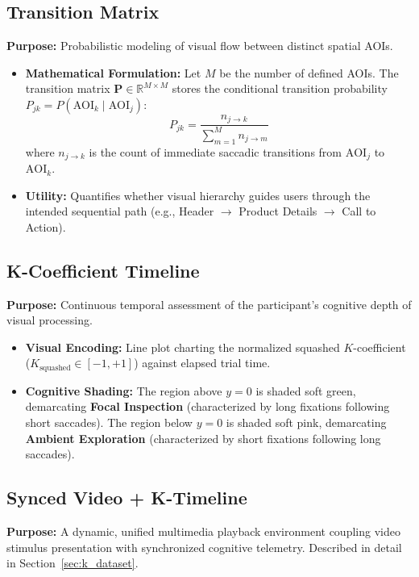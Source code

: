 \documentclass[11pt,a4paper]{article}
\begin{document}
\subsection{Transition Matrix}
\textbf{Purpose:} Probabilistic modeling of visual flow between distinct spatial AOIs.
\begin{itemize}[noitemsep,topsep=2pt]
    \item \textbf{Mathematical Formulation:} Let $M$ be the number of defined AOIs. The transition matrix $\mathbf{P} \in \mathbb{R}^{M \times M}$ stores the conditional transition probability $P_{jk} = P(\text{AOI}_k \mid \text{AOI}_j)$:
    \begin{equation}
        P_{jk} = \frac{n_{j \to k}}{\sum_{m=1}^{M} n_{j \to m}}
    \end{equation}
    where $n_{j \to k}$ is the count of immediate saccadic transitions from $\text{AOI}_j$ to $\text{AOI}_k$.
    \item \textbf{Utility:} Quantifies whether visual hierarchy guides users through the intended sequential path (e.g., Header $\to$ Product Details $\to$ Call to Action).
\end{itemize}

\subsection{K-Coefficient Timeline}
\textbf{Purpose:} Continuous temporal assessment of the participant's cognitive depth of visual processing.
\begin{itemize}[noitemsep,topsep=2pt]
    \item \textbf{Visual Encoding:} Line plot charting the normalized squashed $K$-coefficient ($K_{\text{squashed}} \in [-1, +1]$) against elapsed trial time.
    \item \textbf{Cognitive Shading:} The region above $y = 0$ is shaded soft green, demarcating \textbf{Focal Inspection} (characterized by long fixations following short saccades). The region below $y = 0$ is shaded soft pink, demarcating \textbf{Ambient Exploration} (characterized by short fixations following long saccades).
\end{itemize}

\subsection{Synced Video + K-Timeline}
\textbf{Purpose:} A dynamic, unified multimedia playback environment coupling video stimulus presentation with synchronized cognitive telemetry. Described in detail in Section~\ref{sec:k_dataset}.
\end{document}
